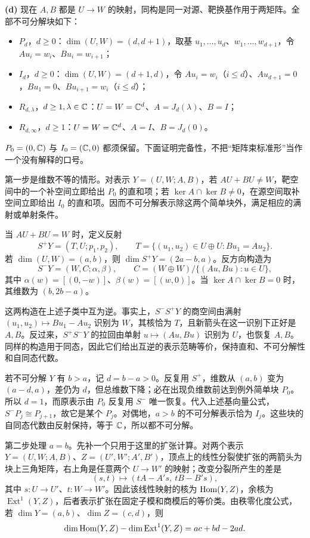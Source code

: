\begin{solution}
\textbf{(d)} 现在 $A,B$ 都是 $U\to W$ 的映射，同构是同一对源、靶换基作用于两矩阵。全部不可分解块如下：
\begin{itemize}
\item $P_d$，$d\ge0$：$\dim(U,W)=(d,d+1)$，取基 $u_1,\ldots,u_d$、$w_1,\ldots,w_{d+1}$，令 $Au_i=w_i$、$Bu_i=w_{i+1}$；
\item $I_d$，$d\ge0$：$\dim(U,W)=(d+1,d)$，令 $Au_i=w_i$（$i\le d$）、$Au_{d+1}=0$，$Bu_1=0$、$Bu_{i+1}=w_i$（$i\le d$）；
\item $R_{d,\lambda}$，$d\ge1,\lambda\in\mathbb C$：$U=W=\mathbb C^d$、$A=J_d(\lambda)$、$B=I$；
\item $R_{d,\infty}$，$d\ge1$：$U=W=\mathbb C^d$、$A=I$、$B=J_d(0)$。
\end{itemize}
$P_0=(0,\mathbb C)$ 与 $I_0=(\mathbb C,0)$ 都须保留。下面证明完备性，不把“矩阵束标准形”当作一个没有解释的口号。

第一步是维数不等的情形。对表示 $Y=(U,W;A,B)$，若 $AU+BU\ne W$，靶空间中的一个补空间立即给出 $P_0$ 的直和项；若 $\ker A\cap\ker B\ne0$，在源空间取补空间立即给出 $I_0$ 的直和项。因而不可分解表示除这两个简单块外，满足相应的满射或单射条件。

当 $AU+BU=W$ 时，定义反射
\[
 S^+Y=(T,U;p_1,p_2),\qquad
 T=\{(u_1,u_2)\in U\oplus U:Bu_1=Au_2\}.
\]
若 $\dim(U,W)=(a,b)$，则 $\dim S^+Y=(2a-b,a)$。反方向构造为
\[
 S^-Y=(W,C;\alpha,\beta),\qquad
 C=(W\oplus W)/\{(Au,Bu):u\in U\},
\]
其中 $\alpha(w)=[(0,-w)]$、$\beta(w)=[(w,0)]$。当 $\ker A\cap\ker B=0$ 时，其维数为 $(b,2b-a)$。

这两构造在上述子类中互为逆。事实上，$S^-S^+Y$ 的商空间由满射 $(u_1,u_2)\mapsto Bu_1-Au_2$ 识别为 $W$，其核恰为 $T$，且新箭头在这一识别下正好是 $A,B$。反过来，$S^+S^-Y$ 的拉回由单射 $u\mapsto(Au,Bu)$ 识别为 $U$，也恢复 $A,B$。同样的构造用于同态，因此它们给出互逆的表示范畴等价，保持直和、不可分解性和自同态代数。

若不可分解 $Y$ 有 $b>a$，记 $d=b-a>0$。反复用 $S^+$，维数从 $(a,b)$ 变为 $(a-d,a)$，差仍为 $d$，但总维数下降；必在出现负维数前达到例外简单块 $P_0$。所以 $d=1$，而原表示由 $P_0$ 反复用 $S^-$ 唯一恢复。代入上述基向量公式，$S^-P_j\cong P_{j+1}$，故它是某个 $P_j$。对偶地，$a>b$ 的不可分解表示恰为 $I_j$。这些块的自同态代数由反射保持，等于 $\mathbb C$，所以都不可分解。

第二步处理 $a=b$。先补一个只用于这里的扩张计算。对两个表示 $Y=(U,W;A,B)$、$Z=(U',W';A',B')$，顶点上的线性分裂使扩张的两箭头为块上三角矩阵，右上角是任意两个 $U\to W'$ 的映射；改变分裂所产生的差是
\[
 (s,t)\longmapsto(tA-A's,\ tB-B's),
\]
其中 $s:U\to U'$、$t:W\to W'$。因此该线性映射的核为 $\operatorname{Hom}(Y,Z)$，余核为 $\operatorname{Ext}^1(Y,Z)$，后者表示扩张在固定子模和商模后的等价类。由秩零化度公式，若 $\dim Y=(a,b)$、$\dim Z=(c,d)$，则
\[
 \dim\operatorname{Hom}(Y,Z)-\dim\operatorname{Ext}^1(Y,Z)=ac+bd-2ad.
\]


\end{solution}
